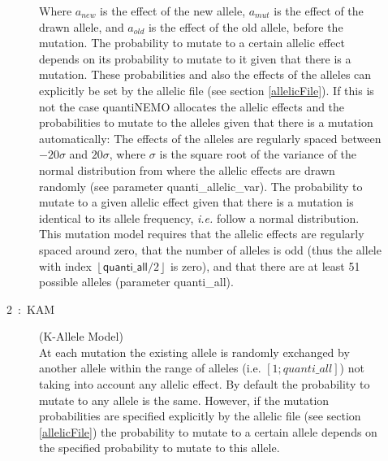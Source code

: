 \documentclass[letterpaper,12pt,oneside]{book}
\begin{document}
\begin{description}
\begin{description}
Where $a_{new}$ is the effect of the new allele, $a_{mut}$ is the effect of the drawn allele, and $a_{old}$ is the effect of the old allele, before the mutation.
The probability to mutate to a certain allelic effect depends on its probability to mutate to it given that there is a mutation. These probabilities and also the effects of the alleles can explicitly be set by the allelic file (see section \ref{allelicFile}). If this is not the case quantiNEMO allocates the allelic effects and the probabilities to mutate to the alleles given that there is a mutation automatically: The effects of the alleles are regularly spaced between $-20\sigma$ and $20\sigma$, where $\sigma$ is the square root of the variance of the normal distribution from where the allelic effects are drawn randomly (see parameter \textsf{quanti\_allelic\_var}). The probability to mutate to a given allelic effect given that there is a mutation is identical to its allele frequency, \textit{i.e.} follow a normal distribution. This mutation model requires that the allelic effects are regularly spaced around zero, that the number of alleles is odd (thus the allele with index $\left\lfloor \textsf{quanti\_all}/2\right\rfloor$ is zero), and that there are at least 51 possible alleles (parameter \textsf{quanti\_all}).  

\item[2~:~KAM] (K-Allele Model)\\
At each mutation the existing allele is randomly exchanged by another allele within the range of alleles (i.e. $[1; quanti\_all]$) not taking into account any allelic effect. By default the probability to mutate to any allele is the same. However, if the mutation probabilities are specified explicitly by the allelic file (see section \ref{allelicFile}) the probability to mutate to a certain allele depends on the specified probability to mutate to this allele.


\end{description}
\end{description}
\end{document}
